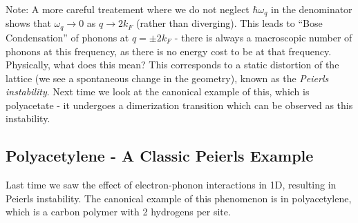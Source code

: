 Note: A more careful treatement where we do not neglect $\hbar \omega_q$ in the denominator shows that $\omega_q \to 0$ as $q \to 2k_F$ (rather than diverging). This leads to ``Bose Condensation'' of phonons at $q = \pm 2k_F$ - there is always a macroscopic number of phonons at this frequency, as there is no energy cost to be at that frequency. Physically, what does this mean? This corresponds to a static distortion of the lattice (we see a spontaneous change in the geometry), known as the \emph{Peierls instability}. Next time we look at the canonical example of this, which is polyacetate - it undergoes a dimerization transition which can be observed as this instability.

\subsection{Polyacetylene - A Classic Peierls Example}
Last time we saw the effect of electron-phonon interactions in 1D, resulting in Peierls instability. The canonical example of this phenomenon is in polyacetylene, which is a carbon polymer with 2 hydrogens per site. 

